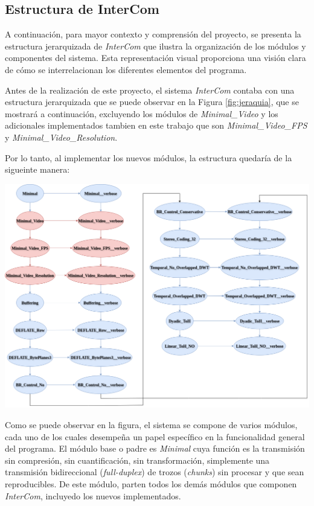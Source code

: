 \subsection{Estructura de InterCom}

A continuación, para mayor contexto y comprensión del proyecto, se presenta la estructura jerarquizada de \textit{InterCom} que ilustra la organización de los módulos y componentes del sistema. Esta representación visual proporciona una visión clara de cómo se interrelacionan los diferentes elementos del programa.
\vspace{\baselineskip}

Antes de la realización de este proyecto, el sistema \textit{InterCom} contaba con una estructura jerarquizada que se puede observar en la Figura \ref{fig:jeraquia}, que se mostrará a continuación, excluyendo los módulos de \textit{Minimal\_Video} y los adicionales implementados tambien en este trabajo que son \textit{Minimal\_Video\_FPS} y \textit{Minimal\_Video\_Resolution}. 

\vspace{\baselineskip}
Por lo tanto, al implementar los nuevos módulos, la estructura quedaría de la sigueinte manera:

\begin{center}
	\includegraphics[width = 1.01\textwidth]{images/jerarquia_modulos.png}
	\label{fig:jeraquia}
\end{center}

\vspace{\baselineskip}
Como se puede observar en la figura, el sistema se compone de varios módulos, cada uno de los cuales desempeña un papel específico en la funcionalidad general del programa. El módulo base o padre es \textit{Minimal} cuya función es la transmisión sin compresión, sin cuantificación, sin transformación, simplemente una transmisión bidireccional (\textit{full-duplex}) de trozos (\textit{chunks}) sin procesar y que sean reproducibles. De este módulo, parten todos los demás módulos que componen \textit{InterCom}, incluyedo los nuevos implementados. 
\vspace{\baselineskip}

